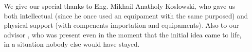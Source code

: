 \begin{acknowledgements}

We give our special thanks to Eng. Mikhail Anatholy Koslowski, who gave us both
intellectual (since he once used an equipament with the same purposed) and
physical support (with compenents importation and equipaments).
Also to our advisor \advisor, who was present even in the moment that the initial
idea came to life, in a situation nobody else would have stayed.

\end{acknowledgements}
